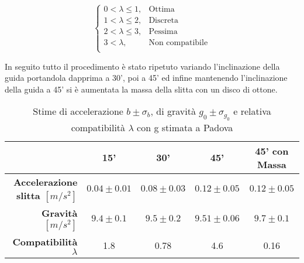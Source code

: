 \documentclass[a4paper,11pt,oneside]{article}
\begin{document}
\begin{equation*}
    \label{eq:cases}
    \begin{cases}
    0<\lambda\leq 1, & \text{Ottima}\\
    1<\lambda\leq2, & \text{Discreta}\\
    2<\lambda\leq3, & \text{Pessima}\\
    3<\lambda, & \text{Non compatibile}\\
    \end{cases}
\end{equation*}




In seguito tutto il procedimento è stato ripetuto variando l'inclinazione della guida portandola dapprima a 30', poi a 45' ed infine mantenendo l'inclinazione della guida a 45' si è aumentata la massa della slitta con un disco di ottone.\\

\begin{table}[h!]
    \centering
    \begin{tabular}{r|c|c|c|c}
    \toprule
    & \textbf{15'} & \textbf{30'} & \textbf{45'} & \textbf{45' con Massa}\\
    \midrule
         \textbf{Accelerazione slitta $[\si{m/s^2}]$} & $0.04\pm0.01$    & $0.08\pm0.03$   & $0.12\pm0.05$    & $0.12\pm0.05$\\
        \textbf{Gravità $[\si{m/s^2}]$}       & $9.4\pm0.1$ & $9.5\pm0.2$ & $9.51\pm0.06$ & $9.7\pm0.1$ \\
        \textbf{Compatibilità $\lambda$} &1.8 &0.78 &4.6 &0.16\\
        \bottomrule
    \end{tabular}
    \caption{Stime di accelerazione $b\pm \sigma_{b}$, di gravità $g_{0} \pm \sigma_{g_{0}}$ e relativa compatibilità $\lambda$ con g stimata a Padova}
    \label{tab:stima_b_g}
\end{table}
\end{document}
